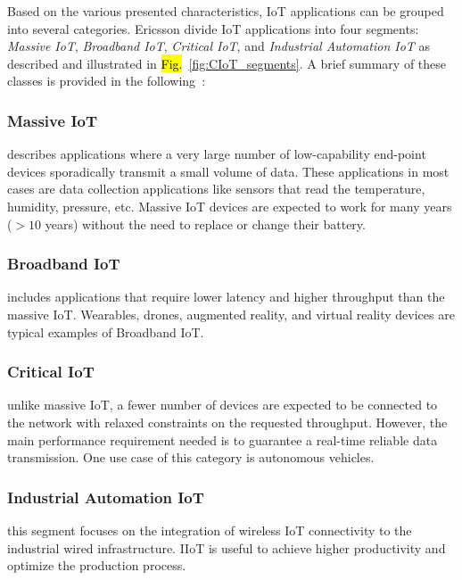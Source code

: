 \documentclass[]{IEEEtran}
\begin{document}
Based on the various presented characteristics, IoT applications can be grouped into several categories.
Ericsson divide IoT applications into four segments: \textit{Massive IoT}, \textit{Broadband IoT}, \textit{Critical IoT}, and \textit{Industrial Automation IoT} as described and illustrated in \hl{Fig.}~\ref{fig:CIoT_segments}.
A brief summary of these classes is provided in the following~\cite{zaidi_cellular_2020}:

\subsubsection{Massive IoT}
describes applications where a very large number of low-capability end-point devices sporadically transmit a small volume of data.
These applications in most cases are data collection applications like sensors that read the temperature, humidity, pressure, etc.
Massive IoT devices are expected to work for many years ($>10$ years) without the need to replace or change their battery.

\subsubsection{Broadband IoT}
includes applications that require lower latency and higher throughput than the massive IoT. Wearables, drones, augmented reality, and virtual reality devices
are typical examples of Broadband IoT.

\subsubsection{Critical IoT}
unlike massive IoT, a fewer number of devices are expected to be connected to the network with relaxed constraints on the requested throughput.
However, the main performance requirement needed is to guarantee a real-time reliable data transmission.
One use case of this category is autonomous vehicles.

\subsubsection{Industrial Automation IoT}
this segment focuses on the integration of wireless IoT connectivity to the industrial wired infrastructure. IIoT is useful to achieve higher productivity and optimize the production process.
\end{document}
